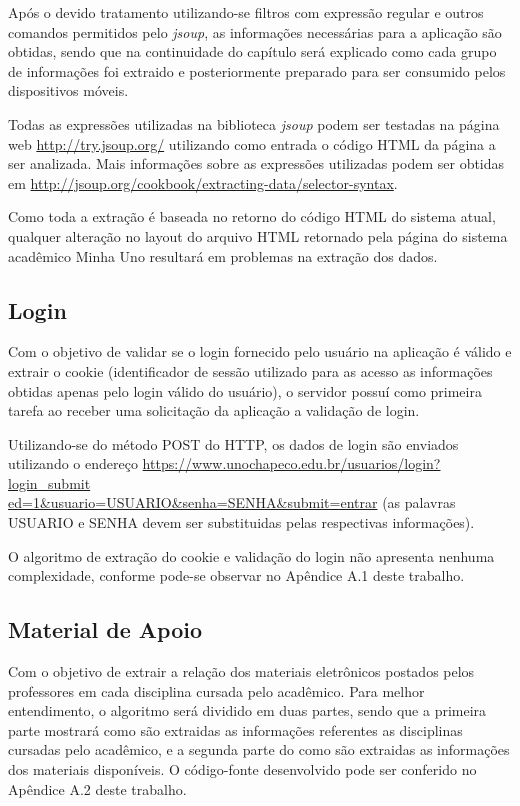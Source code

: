 Após o devido tratamento utilizando-se filtros com expressão regular e outros comandos permitidos pelo \emph{jsoup}, as informações necessárias para a aplicação são obtidas, sendo que na continuidade do capítulo será explicado como cada grupo de informações foi extraido e posteriormente preparado para ser consumido pelos dispositivos móveis.

Todas as expressões utilizadas na biblioteca \emph{jsoup} podem ser testadas na página web \url{http://try.jsoup.org/} utilizando como entrada o código HTML da página a ser analizada. Mais informações sobre as expressões utilizadas podem ser obtidas em \url{http://jsoup.org/cookbook/extracting-data/selector-syntax}.

Como toda a extração é baseada no retorno do código HTML do sistema atual, qualquer alteração no layout do arquivo HTML retornado pela página do sistema acadêmico Minha Uno resultará em problemas na extração dos dados.


\subsection{Login}
Com o objetivo de validar se o login fornecido pelo usuário na aplicação é válido e extrair o cookie (identificador de sessão utilizado para as acesso as informações obtidas apenas pelo login válido do usuário), o servidor possuí como primeira tarefa ao receber uma solicitação da aplicação a validação de login.

Utilizando-se do método POST do HTTP, os dados de login são enviados utilizando o endereço \url{https://www.unochapeco.edu.br/usuarios/login?login_submit} \\ \url{ed=1&usuario=USUARIO&senha=SENHA&submit=entrar} (as palavras USUARIO e SENHA devem ser substituidas pelas respectivas informações).


O algoritmo de extração do cookie e validação do login não apresenta nenhuma complexidade, conforme pode-se observar no Apêndice A.1 deste trabalho.

\subsection{Material de Apoio}
Com o objetivo de extrair a relação dos materiais eletrônicos postados pelos professores em cada disciplina cursada pelo acadêmico. Para melhor entendimento, o algoritmo será dividido em duas partes, sendo que a primeira parte mostrará como são extraidas as informações referentes as disciplinas cursadas pelo acadêmico, e a segunda parte do como são extraidas as informações dos materiais disponíveis. O código-fonte desenvolvido pode ser conferido no Apêndice A.2 deste trabalho.

